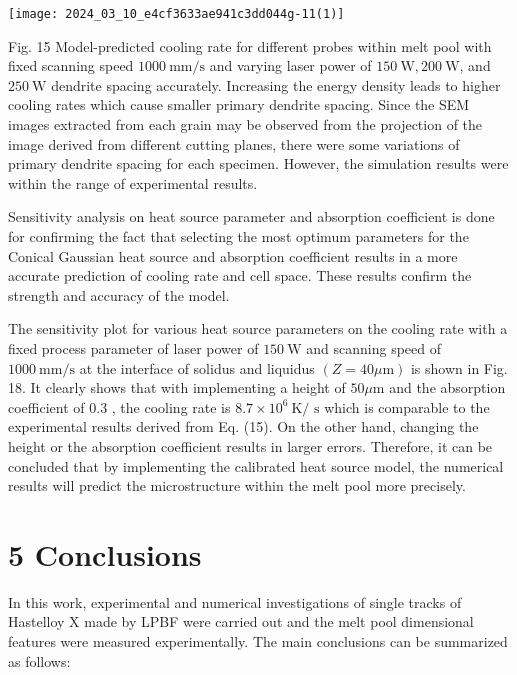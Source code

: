 \documentclass[10pt]{article}
\begin{document}
\begin{center}
\texttt{[image: 2024\_03\_10\_e4cf3633ae941c3dd044g-11(1)]}
\end{center}

Fig. 15 Model-predicted cooling rate for different probes within melt pool with fixed scanning speed $1000 \mathrm{~mm} / \mathrm{s}$ and varying laser power of $150 \mathrm{~W}, 200 \mathrm{~W}$, and $250 \mathrm{~W}$ dendrite spacing accurately. Increasing the energy density leads to higher cooling rates which cause smaller primary dendrite spacing. Since the SEM images extracted from each grain may be observed from the projection of the image derived from different cutting planes, there were some variations of primary dendrite spacing for each specimen. However, the simulation results were within the range of experimental results.

Sensitivity analysis on heat source parameter and absorption coefficient is done for confirming the fact that selecting the most optimum parameters for the Conical Gaussian heat source and absorption coefficient results in a more accurate prediction of cooling rate and cell space. These results confirm the strength and accuracy of the model.

The sensitivity plot for various heat source parameters on the cooling rate with a fixed process parameter of laser power of $150 \mathrm{~W}$ and scanning speed of $1000 \mathrm{~mm} / \mathrm{s}$ at the interface of solidus and liquidus $(Z=40 \mu \mathrm{m})$ is shown in Fig. 18. It clearly shows that with implementing a height of $50 \mu \mathrm{m}$ and the absorption coefficient of 0.3 , the cooling rate is $8.7 \times 10^{6} \mathrm{~K} /$ $\mathrm{s}$ which is comparable to the experimental results derived from Eq. (15). On the other hand, changing the height or the absorption coefficient results in larger errors. Therefore, it can be concluded that by implementing the calibrated heat source model, the numerical results will predict the microstructure within the melt pool more precisely.

\section*{5 Conclusions}
In this work, experimental and numerical investigations of single tracks of Hastelloy X made by LPBF were carried out and the melt pool dimensional features were measured experimentally. The main conclusions can be summarized as follows:
\end{document}
